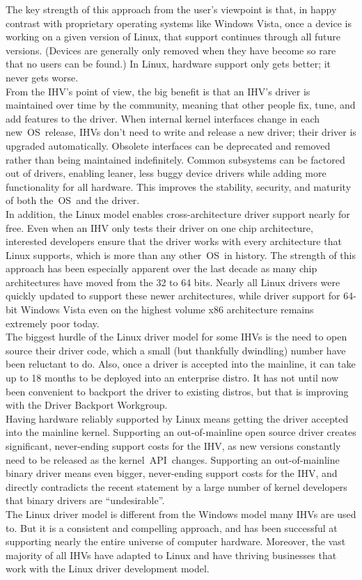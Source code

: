 The key strength of this approach from the user's viewpoint is that, in happy contrast with proprietary operating systems like Windows Vista, once a device is working on a given version of Linux, that support continues through all future versions. (Devices are generally only removed when they have become so rare that no users can be found.) In Linux, hardware support only gets better; it never gets worse.\\
From the IHV's point of view, the big benefit is that an IHV's driver is maintained over time by the community, meaning that other people fix, tune, and add features to the driver. When internal kernel interfaces change in each new OS release, IHVs don't need to write and release a new driver; their driver is upgraded automatically. Obsolete interfaces can be deprecated and removed rather than being maintained indefinitely. Common subsystems can be factored out of drivers, enabling leaner, less buggy device drivers while adding more functionality for all hardware. This improves the stability, security, and maturity of both the OS and the driver.\\
In addition, the Linux model enables cross-architecture driver support nearly for free. Even when an IHV only tests their driver on one chip architecture, interested developers ensure that the driver works with every architecture that Linux supports, which is more than any other OS in history. The strength of this approach has been especially apparent over the last decade as many chip architectures have moved from the 32 to 64 bits. Nearly all Linux drivers were quickly updated to support these newer architectures, while driver support for 64-bit Windows Vista even on the highest volume x86 architecture remains extremely poor today.\\
The biggest hurdle of the Linux driver model for some IHVs is the need to open source their driver code, which a small (but thankfully dwindling) number have been reluctant to do. Also, once a driver is accepted into the mainline, it can take up to 18 months to be deployed into an enterprise distro. It has not until now been convenient to backport the driver to existing distros, but that is improving with the Driver Backport Workgroup.\\
Having hardware reliably supported by Linux means getting the driver accepted into the mainline kernel. Supporting an out-of-mainline open source driver creates significant, never-ending support costs for the IHV, as new versions constantly need to be released as the kernel API changes. Supporting an out-of-mainline binary driver means even bigger, never-ending support costs for the IHV, and directly contradicts the recent statement by a large number of kernel developers that binary drivers are “undesirable”.\\
The Linux driver model is different from the Windows model many IHVs are used to. But it is a consistent and compelling approach, and has been successful at supporting nearly the entire universe of computer hardware. Moreover, the vast majority of all IHVs have adapted to Linux and have thriving businesses that work with the Linux driver development model.
